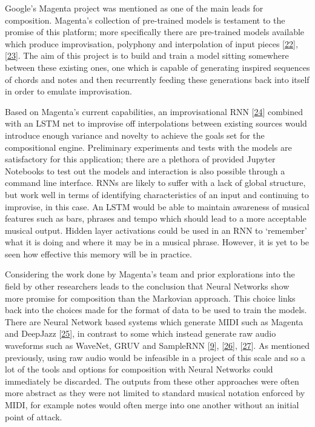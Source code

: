 \documentclass[12pt,]{article}
\begin{document}
Google's Magenta project was mentioned as one of the main leads for
composition. Magenta's collection of pre-trained models is testament to
the promise of this platform; more specifically there are pre-trained
models available which produce improvisation, polyphony and
interpolation of input pieces
{[}\protect\hyperlink{ref-magentavae}{22}{]},
{[}\protect\hyperlink{ref-magentapolyphony}{23}{]}. The aim of this
project is to build and train a model sitting somewhere between these
existing ones, one which is capable of generating inspired sequences of
chords and notes and then recurrently feeding these generations back
into itself in order to emulate improvisation.

Based on Magenta's current capabilities, an improvisational RNN
{[}\protect\hyperlink{ref-magentaimprov}{24}{]} combined with an LSTM
net to improvise off interpolations between existing sources would
introduce enough variance and novelty to achieve the goals set for the
compositional engine. Preliminary experiments and tests with the models
are satisfactory for this application; there are a plethora of provided
Jupyter Notebooks to test out the models and interaction is also
possible through a command line interface. RNNs are likely to suffer
with a lack of global structure, but work well in terms of identifying
characteristics of an input and continuing to improvise, in this case.
An LSTM would be able to maintain awareness of musical features such as
bars, phrases and tempo which should lead to a more acceptable musical
output. Hidden layer activations could be used in an RNN to `remember'
what it is doing and where it may be in a musical phrase. However, it is
yet to be seen how effective this memory will be in practice.

Considering the work done by Magenta's team and prior explorations into
the field by other researchers leads to the conclusion that Neural
Networks show more promise for composition than the Markovian approach.
This choice links back into the choices made for the format of data to
be used to train the models. There are Neural Network based systems
which generate MIDI such as Magenta and DeepJazz
{[}\protect\hyperlink{ref-deepjazz}{25}{]}, in contrast to some which
instead generate raw audio waveforms such as WaveNet, GRUV and SampleRNN
{[}\protect\hyperlink{ref-oord2016wavenet}{9}{]},
{[}\protect\hyperlink{ref-Nayebi2015GRUVA}{26}{]},
{[}\protect\hyperlink{ref-mehri2016samplernn}{27}{]}. As mentioned
previously, using raw audio would be infeasible in a project of this
scale and so a lot of the tools and options for composition with Neural
Networks could immediately be discarded. The outputs from these other
approaches were often more abstract as they were not limited to standard
musical notation enforced by MIDI, for example notes would often merge
into one another without an initial point of attack.
\end{document}
